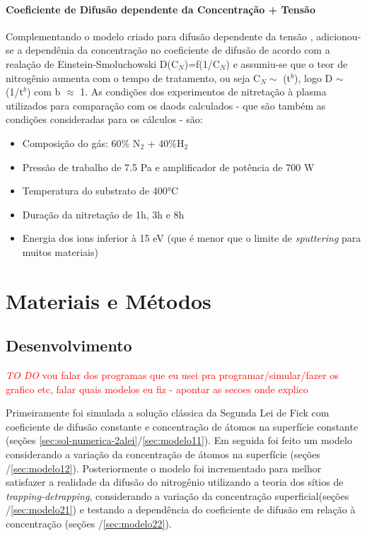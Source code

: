 \documentclass[]{politex}
\newcommand\myworries[1]{\textcolor{red}{#1}}
\begin{document}
\subsubsection{Coeficiente de Difusão dependente da Concentração + Tensão}
\label{sec:comb-depc-stress}
	Complementando o modelo criado para difusão dependente da tensão \cite{galdikas2010stress}, adicionou-se a dependênia da concentração no coeficiente de difusão de acordo com a realação de Einstein-Smoluchowski D(C$_N$)=f(1/C$_N$) \cite{moskalioviene2012stress} e assumiu-se que o teor de nitrogênio aumenta com o tempo de tratamento, ou seja C$_N\sim$ (t$^b$), logo D $\sim$ (1/t$^b$) com b $\approx$ 1.
	As condições dos experimentos de nitretação à plasma utilizados para comparação com os daods calculados - que são também as condições consideradas para os cálculos - são: 
	\begin{itemize}
	 \item Composição do gás: 60\% N$_2$ + 40\%H$_2$
	 \item Pressão de trabalho de 7.5 Pa e amplificador de potência de 700 W
	 \item Temperatura do substrato de 400°C
	 \item Duração da nitretação de 1h, 3h e 8h
  	 \item Energia dos ions inferior à 15 eV (que é menor que o limite de \textit{sputtering} para muitos materiais)
	\end{itemize}
	

\chapter{Materiais e Métodos}
\section{Desenvolvimento}
\myworries{\textit{TO DO}}
\myworries{vou falar dos programas que eu usei pra programar/simular/fazer os grafico etc, falar quais modelos eu fiz - apontar as secoes onde explico}

Primeiramente foi simulada a solução clássica da Segunda Lei de Fick com coeficiente de difusão constante e concentração de átomos na superfície constante (seções \ref{sec:sol-numerica-2alei}/\ref{sec:modelo11}). Em seguida foi feito um modelo considerando a variação da concentração de átomos na superfície (seções /\ref{sec:modelo12}). Posteriormente o modelo foi incrementado para melhor satisfazer a realidade da difusão do nitrogênio utilizando a teoria dos sítios de \textit{trapping-detrapping}, considerando a variação da concentração superficial(seções /\ref{sec:modelo21}) e testando a dependência do coeficiente de difusão em relação à concentração (seções /\ref{sec:modelo22}).
\end{document}
